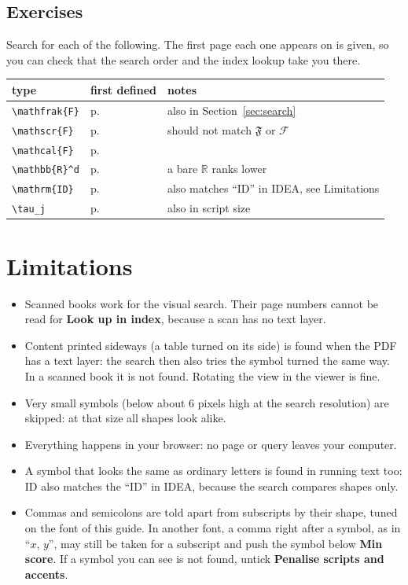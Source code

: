 \documentclass[11pt]{article}
\begin{document}
\subsection*{Exercises}
Search for each of the following. The first page each one appears on is
given, so you can check that the search order and the index lookup take you
there.
\begin{center}
\begin{tabular}{lll}
  type & first defined & notes \\ \hline
  \verb|\mathfrak{F}| & p.\,\pageref{def:frak} & also in Section~\ref{sec:search} \\
  \verb|\mathscr{F}|  & p.\,\pageref{def:scr}  & should not match $\mathfrak{F}$ or $\mathcal{F}$ \\
  \verb|\mathcal{F}|  & p.\,\pageref{def:cal}  & \\
  \verb|\mathbb{R}^d| & p.\,\pageref{def:R}    & a bare $\mathbb{R}$ ranks lower \\
  \verb|\mathrm{ID}|  & p.\,\pageref{def:ID}   & also matches ``ID'' in IDEA, see Limitations \\
  \verb|\tau_j|       & p.\,\pageref{def:tau}  & also in script size \\
\end{tabular}
\end{center}

\section{Limitations}
\begin{itemize}
  \item Scanned books work for the visual search. Their page numbers
        cannot be read for \textbf{Look up in index}, because a scan has no
        text layer.
  \item Content printed sideways (a table turned on its side) is found
        when the PDF has a text layer: the search then also tries the symbol
        turned the same way. In a scanned book it is not found. Rotating the
        view in the viewer is fine.
  \item Very small symbols (below about 6 pixels high at the search
        resolution) are skipped: at that size all shapes look alike.
  \item Everything happens in your browser: no page or query leaves your
        computer.
  \item A symbol that looks the same as ordinary letters is found in running 
      text too: $\mathrm{ID}$ also matches the ``ID'' in IDEA, because the
      search compares shapes only.
  \item Commas and semicolons are told apart from subscripts by their shape,
      tuned on the font of this guide. In another font, a comma right after
      a symbol, as in ``$x$, $y$'', may still be taken for a subscript and
      push the symbol below \textbf{Min score}. If a symbol you can see is
      not found, untick \textbf{Penalise scripts and accents}.
\end{itemize}
\end{document}
